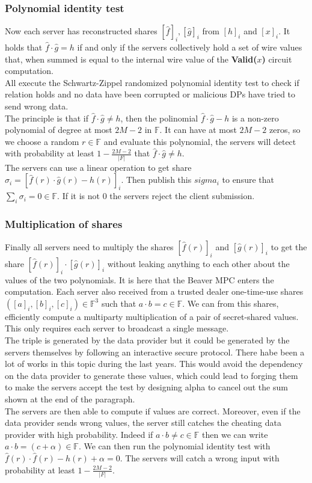 \documentclass{article}
\begin{document}
\subsubsection{Polynomial identity test}
Now each server has reconstructed shares $[\hat{f}]_i, [\hat{g}]_i$ from $[h]_i$ and $[x]_i$. It holds that $ \hat{f} \cdot \hat{g} = h$ if and only if the servers collectively hold a set of wire values that, when summed is equal to the internal wire value of the \textbf{Valid($x$)} circuit computation.\\
All execute the Schwartz-Zippel randomized polynomial identity test \cite{polyverif} to check if relation holds and no data have been corrupted or malicious DPs have tried to send wrong data.\\
The principle is that if $ \hat{f} \cdot \hat{g} \neq h$, then the polinomial $ \hat{f} \cdot \hat{g} - h$ is a non-zero polynomial of degree at most $2M-2$ in $\mathbb{F}$. It can have at most $2M-2$ zeros, so we choose a random $r \in \mathbb{F}$ and evaluate this polynomial, the servers will detect with probability at least $1 - \frac{2M-2}{|F|}$ that $ \hat{f} \cdot \hat{g} \neq h$.\\
The servers can use a linear operation to get share $\sigma_i = [ \hat{f}(r) \cdot \hat{g}(r) - h(r)]_i$. Then publish this $sigma_i$ to ensure that $\sum_{i}{\sigma_i} = 0 \in \mathbb{F}$. If it is not $0$ the servers reject the client submission.
\subsubsection{Multiplication of shares}
Finally all servers need to multiply the shares $ [\hat{f}(r)]_i $ and $ [\hat{g}(r)]_i$ to get the share $[\hat{f}(r)]_i \cdot [\hat{g}(r)]_i$ without leaking anything to each other about the values of the two polynomials. It is here that the Beaver MPC enters the computation. Each server also received from a trusted dealer one-time-use shares $([a]_i,[b]_i,[c]_i) \in \mathbb{F}^3 $ such that $a \cdot b = c \in \mathbb{F}$. We can from this shares, efficiently compute a multiparty multiplication of a pair of secret-shared values. This only requires each server to broadcast a single message.\\
The triple is generated by the data provider but it could be generated by the servers themselves by following an interactive secure protocol. There habe been a lot of works in this topic during the last years. This would avoid the dependency on the data provider to generate these values, which could lead to forging them to make the servers accept the test by designing alpha to cancel out the sum shown at the end of the paragraph.\\
The servers are then able to compute if values are correct. Moreover, even if the data provider sends wrong values, the server still catches the cheating data provider with high probability. Indeed if $a \cdot b \neq c \in \mathbb{F}$ then we can write $a \cdot b = (c + \alpha) \in \mathbb{F}$. We can then run the polynomial identity test with $\hat{f}(r) \cdot \hat{f}(r) - h(r) + \alpha = 0$. The servers will catch a wrong input with probability at least $1 - \frac{2M-2}{|F|}$.
\end{document}

